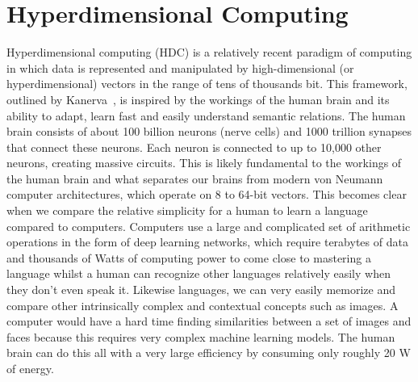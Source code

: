 \chapter[Hyperdimensional computing]{Hyperdimensional Computing}
Hyperdimensional computing (HDC) is a relatively recent paradigm of computing in which data is represented and manipulated by high-dimensional (or hyperdimensional) vectors in the range of tens of thousands bit. This framework, outlined by Kanerva~\cite{Kanerva2009}, is inspired by the workings of the human brain and its ability to adapt, learn fast and easily understand semantic relations. The human brain consists of about 100 billion neurons (nerve cells) and 1000 trillion synapses that connect these neurons. Each neuron is connected to up to 10,000 other neurons, creating massive circuits. This is likely fundamental to the workings of the human brain and what separates our brains from modern von Neumann computer architectures, which operate on 8 to 64-bit vectors. This becomes clear when we compare the relative simplicity for a human to learn a language compared to computers. Computers use a large and complicated set of arithmetic operations in the form of deep learning networks, which require terabytes of data and thousands of Watts of computing power to come close to mastering a language whilst a human can recognize other languages relatively easily when they don't even speak it. Likewise languages, we can very easily memorize and compare other intrinsically complex and contextual concepts such as images. A computer would have a hard time finding similarities between a set of images and faces because this requires very complex machine learning models. The human brain can do this all with a very large efficiency by consuming only roughly 20 W of energy.

